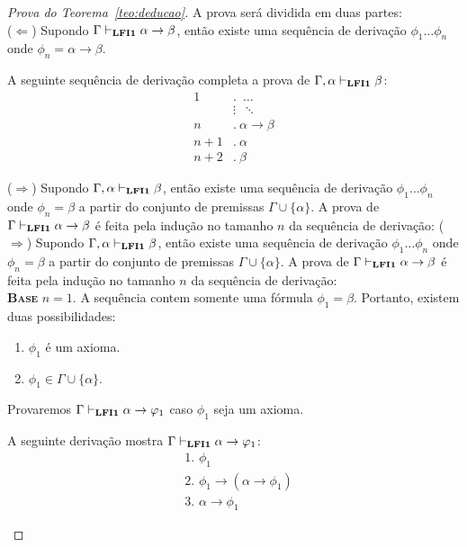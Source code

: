     \begin{proof}[Prova do Teorema~\ref{teo:deducao}] A prova será dividida em duas partes:\\
        ($\Longleftarrow$) Supondo $\Gamma \vdash_{\textbf{LFI1}{}} \alpha \to \beta$, então existe uma sequência de derivação $\phi_{1} \ldots \phi_{n}$ onde $\phi_{n} = \alpha \to \beta$. 
        
        A seguinte sequência de derivação completa a prova de $\Gamma, \alpha \vdash_{\textbf{LFI1}{}} \beta$:
        \begin{align*}
            \text{1}&.~ \; \ldots\\
            & \vdots \; ~\ddots\\
            \text{$n$}&.~ \alpha \to \beta\tag{Suposição}\\
            \text{$n + 1$}&.~ \alpha\tag{Premissa}\\
            \text{$n + 2$}&.~ \beta\tag{MP $n, n + 1$}
        \end{align*}

        \noindent  ($\Longrightarrow$) Supondo $\Gamma, \alpha \vdash_{\textbf{LFI1}{}} \beta$, então existe uma sequência de derivação $\phi_{1} \ldots \phi_{n}$ onde $\phi_{n} = \beta$ a partir do conjunto de premissas $\Gamma \cup \{\alpha\}$. A prova de $\Gamma \vdash_{\textbf{LFI1}{}} \alpha \to \beta$ é feita pela indução no tamanho $n$ da sequência de derivação:
        \noindent  ($\Longrightarrow$) Supondo $\Gamma, \alpha \vdash_{\textbf{LFI1}{}} \beta$, então existe uma sequência de derivação $\phi_{1} \ldots \phi_{n}$ onde $\phi_{n} = \beta$ a partir do conjunto de premissas $\Gamma \cup \{\alpha\}$. A prova de $\Gamma \vdash_{\textbf{LFI1}{}} \alpha \to \beta$ é feita pela indução no tamanho $n$ da sequência de derivação:\\

        \noindent \textbf{\textsc{Base}} $n = 1$.
        A sequência contem somente uma fórmula $\phi_{1} = \beta$. Portanto, existem duas possibilidades:
        \begin{enumerate}
            \item $\phi_{1}$ é um axioma.
            \item $\phi_{1} \in \Gamma \cup \{\alpha\}$.
        \end{enumerate}

        \begin{provaporcasos}
            \casodeprova Provaremos $\Gamma \vdash_{\textbf{LFI1}{}} \alpha \to \varphi_{1}$ caso $\phi_{1}$ seja um axioma. 
            
                A seguinte derivação mostra $\Gamma \vdash_{\textbf{LFI1}{}} \alpha \to \varphi_{1}$:
                \begin{align*}
                    & \text{1. } \phi_{1} \tag{Axioma}\\
                    & \text{2. } \phi_{1} \to (\alpha \to \phi_{1}) \tag{Ax1}\\
                    & \text{3. } \alpha \to \phi_{1} \tag{MP 1,2}
                \end{align*}


\end{provaporcasos}
\end{proof}
